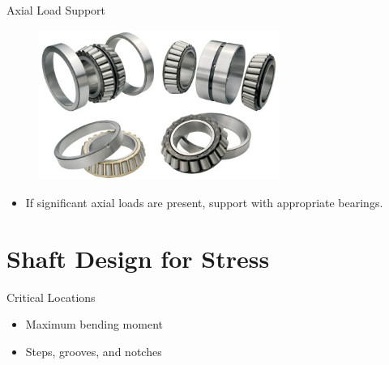 \documentclass[10pt, svgnames]{beamer}
\begin{document}
\begin{frame}[label={sec:orge461290}]{Axial Load Support}
\begin{figure}[htbp]
  \centering
  \includegraphics[width=0.7\textwidth]{Pictures/tapered-bearings}
\end{figure}

\begin{itemize}
\item If significant axial loads are present, support with appropriate bearings.
\end{itemize}
\end{frame}

\section{Shaft Design for Stress}
\label{sec:org519c92e}

\begin{frame}[label={sec:orgabee04f}]{Critical Locations}
\begin{itemize}
\item Maximum bending moment
\item Steps, grooves, and notches
\end{itemize}
\end{frame}
\end{document}

